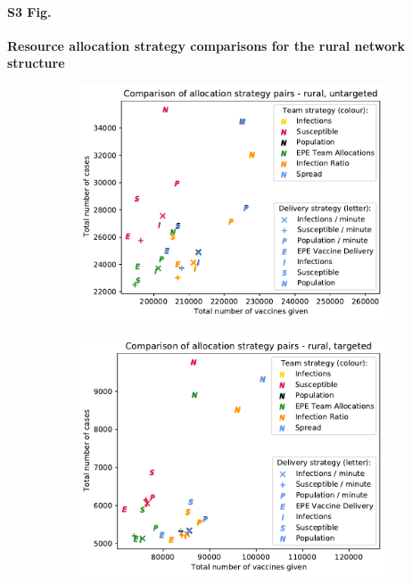 \documentclass[10pt,letterpaper]{article}
\begin{document}
\paragraph*{S3 Fig.}
\label{SI:S3_fig}
{\bf Resource allocation strategy comparisons for the rural network structure}
\begin{figure}[ht!]
  \begin{subfigure}[b]{0.5\textwidth}
    \includegraphics[width=\textwidth]{figures/strategies/team_vaccine_scatter_untargeted_rural.pdf}
    \label{fig:strat_scatter_unt_rural}
  \end{subfigure}
  \begin{subfigure}[b]{0.5\textwidth}
    \includegraphics[width=\textwidth]{figures/strategies/team_vaccine_scatter_targeted_rural.pdf}
    \label{fig:strat_scatter_tar_rural}
  \end{subfigure}
\end{figure}
\end{document}
